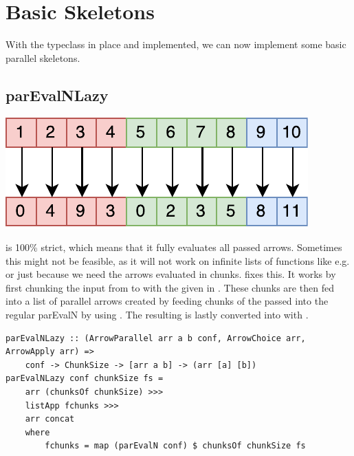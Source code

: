 \section{Basic Skeletons}

With the  typeclass in place and implemented, we can now implement some basic parallel skeletons.

\subsection{parEvalNLazy}
\begin{center}
	\includegraphics[scale=0.7]{images/parEvalNLazy}
\end{center}
 is 100\% strict, which means that it fully evaluates all passed arrows. Sometimes this might not be feasible, as it will not work on infinite lists of functions like e.g.  or just because we need the arrows evaluated in chunks.  fixes this. It works by first chunking the input from \code{[a]} to \code{[[a]]} with the given  in . These chunks are then fed into a list \code{[arr [a] [b]]} of parallel arrows created by feeding chunks of the passed  into the regular parEvalN by using . The resulting \code{[[b]]} is lastly converted into \code{[b]} with .
\begin{lstlisting}[frame=htrbl]
parEvalNLazy :: (ArrowParallel arr a b conf, ArrowChoice arr, ArrowApply arr) =>
	conf -> ChunkSize -> [arr a b] -> (arr [a] [b])
parEvalNLazy conf chunkSize fs =
	arr (chunksOf chunkSize) >>>
	listApp fchunks >>>
	arr concat
	where
		fchunks = map (parEvalN conf) $ chunksOf chunkSize fs
\end{lstlisting}


